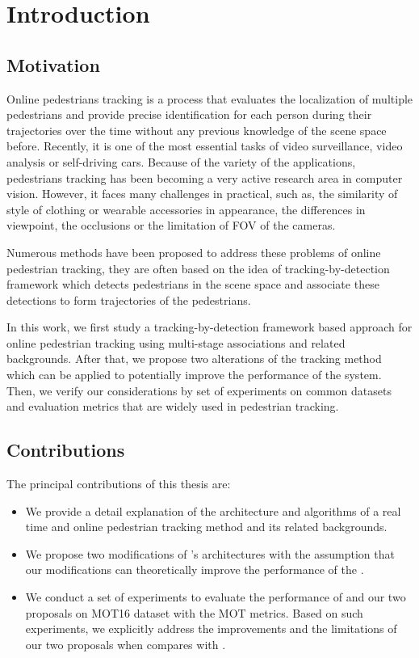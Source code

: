 \chapter{Introduction}
\section{Motivation}
\hspace{0.5cm}Online pedestrians tracking is a process that evaluates the localization of multiple pedestrians
 and provide precise identification for each person during their trajectories over the time without any previous 
 knowledge of the scene space before. Recently, it is one of the most essential tasks of video surveillance, 
 video analysis or self-driving cars. Because of the variety of the applications, 
 pedestrians tracking has been becoming a very active research area in computer vision. However, 
 it faces many challenges in practical, such as, the similarity of style of clothing or wearable 
 accessories in appearance, 
the differences in viewpoint, the occlusions or the limitation of \acrshort{FOV} of the cameras.\par
Numerous methods have been proposed to address these problems of online pedestrian tracking, they are often based on the idea of tracking-by-detection framework which detects pedestrians in the scene space and associate these detections to form trajectories of the pedestrians.\par
In this work, we first study a tracking-by-detection framework based approach for online pedestrian tracking using
multi-stage associations \cite{Wojke2017simple} and related backgrounds. After that, we propose two alterations of the
tracking method \cite{Wojke2017simple} which can be applied to potentially improve the performance of the system. Then, we
verify our considerations by set of experiments on common datasets and evaluation metrics that are widely used in
pedestrian tracking.
\pagebreak
\section{Contributions}
\hspace{0.5cm} The principal contributions of this thesis are:
\begin{itemize}
    \item We provide a detail explanation of the architecture and algorithms of a real time and online pedestrian tracking method\cite{Wojke2017simple} and its related backgrounds.
    \item We propose two modifications of \cite{Wojke2017simple}'s architectures with the assumption that our modifications can theoretically improve the performance of the \cite{Wojke2017simple}.
    \item We conduct a set of experiments to evaluate the performance of \cite{Wojke2017simple} and our two proposals on MOT16 dataset with the MOT metrics\cite{Milan2016MOT16AB}. Based on such experiments, we explicitly address the improvements and the limitations of our two proposals when compares with \cite{Wojke2017simple}.
\end{itemize}
